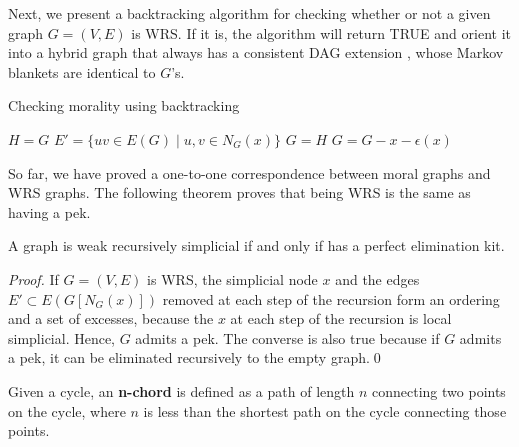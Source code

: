 Next, we present a backtracking algorithm for checking whether or not a given graph $G=(V,E)$ is WRS. If it is, the algorithm will return TRUE and orient it into a hybrid graph that always has a consistent DAG extension \cite{dor1992simple}, whose Markov blankets are identical to $G$'s.
\begin{algorithm}[]
\caption{Checking morality using backtracking}
\label{alg:wrs_bktr}
\begin{algorithmic}[]
	
    \EndIf
    
    	\State $H = G$ 
    	 
    		\State $E'=\{uv \in E(G) \mid u,v\in N_G(x)\}$
    		 
    			\State $G=H$ 
    			\State $G=G-x-\epsilon(x)$ 
        			 
        		\EndIf
      		\EndFor
      	\EndFor
    \EndIf
    
    \State {} 
    \EndFunction
\end{algorithmic}
\end{algorithm}

So far, we have proved a one-to-one correspondence between moral graphs and WRS graphs. The following theorem proves that being WRS is the same as having a pek.  

\begin{theorem}
A graph is weak recursively simplicial if and only if has a perfect elimination kit. 
\end{theorem}
\begin{proof}
If $G=(V,E)$ is WRS, the simplicial node $x$ and the edges $E' \subset E(G[N_G(x)])$ removed at each step of the recursion form an ordering and a set of excesses, because the $x$ at each step of the recursion is local simplicial. Hence, $G$ admits a pek. The converse is also true because if $G$ admits a pek, it can be eliminated recursively to the empty graph.\qed
\end{proof}

\iffalse
\begin{definition}
Given a cycle, an \textbf{n-chord} is defined as a path of length $n$ connecting two points on the cycle, where $n$ is less than the shortest path on the cycle connecting those points. 
\end{definition}

